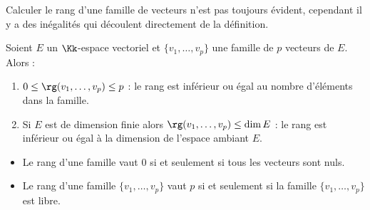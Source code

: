\documentclass[class=report,crop=false]{standalone}
\begin{document}
Calculer le rang d'une famille de vecteurs n'est pas toujours évident, cependant
il y a des inégalités qui découlent directement de la définition.
\begin{proposition}
Soient $E$ un $\Kk$-espace vectoriel et $\{v_1, \ldots ,v_p\}$
une famille de $p$ vecteurs de $E$. Alors :
\begin{enumerate}
  \item $0 \le \rg (v_1, \ldots ,v_p) \le p$ : le rang est inférieur ou égal au nombre d'éléments dans la famille.

  \item Si $E$ est de dimension finie alors $\rg (v_1, \ldots ,v_p) \le \dim E$ :
  le rang est inférieur ou égal à la dimension de l'espace ambiant $E$.
\end{enumerate}
\end{proposition}

\begin{remarque*}
\sauteligne
\begin{itemize}
  \item Le rang d'une famille vaut $0$ si et seulement si tous les vecteurs sont nuls.
  \item Le rang d'une famille $\{v_1, \ldots ,v_p\}$ vaut $p$ si et seulement si
  la famille $\{v_1, \ldots ,v_p\}$ est libre.
\end{itemize}
\end{remarque*}
\end{document}
